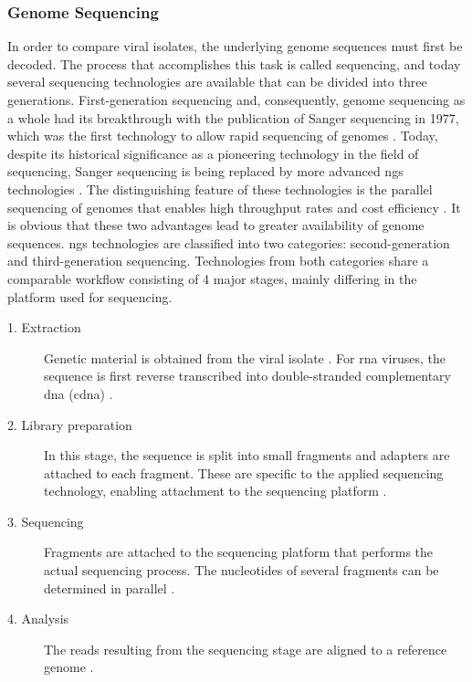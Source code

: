 \subsubsection{Genome Sequencing}
\label{sec:genome_sequencing_technologies}
In order to compare viral isolates, the underlying genome sequences must first be decoded. The process that accomplishes this task is called sequencing, and today several sequencing technologies are available that can be divided into three generations. 
First-generation sequencing and, consequently, genome sequencing as a whole had its breakthrough with the publication of Sanger sequencing in 1977, which was the first technology to allow rapid sequencing of genomes \cite{Sat1,San2}. 
Today, despite its historical significance as a pioneering technology in the field of sequencing, Sanger sequencing is being replaced by more advanced \acrfull{ngs} technologies \cite{Sat1}. The distinguishing feature of these technologies is the parallel sequencing of genomes that enables high throughput rates and cost efficiency \cite{Hu1, Sat1}. It is obvious that these two advantages lead to greater availability of genome sequences.
\acrshort{ngs} technologies are classified into two categories: second-generation and third-generation sequencing. Technologies from both categories share a comparable workflow consisting of 4 major stages, mainly differing in the platform used for sequencing.

\begin{description}
    \item[1. Extraction] Genetic material is obtained from the viral isolate \cite{Idt1}. For \acrshort{rna} viruses, the sequence is first reverse transcribed into double-stranded complementary \acrshort{dna} (\acrshort{cdna}) \cite{Kub1}.
    \item[2. Library preparation] In this stage, the sequence is split into small fragments and adapters are attached to each fragment. These are specific to the applied sequencing technology, enabling attachment to the sequencing platform \cite{Idt1}.
    \item[3. Sequencing] Fragments are attached to the sequencing platform that performs the actual sequencing process. The nucleotides of several fragments can be determined in parallel \cite{Idt1}.
    \item[4. Analysis] The reads resulting from the sequencing stage are aligned to a reference genome \cite{Idt1}.
\end{description}


